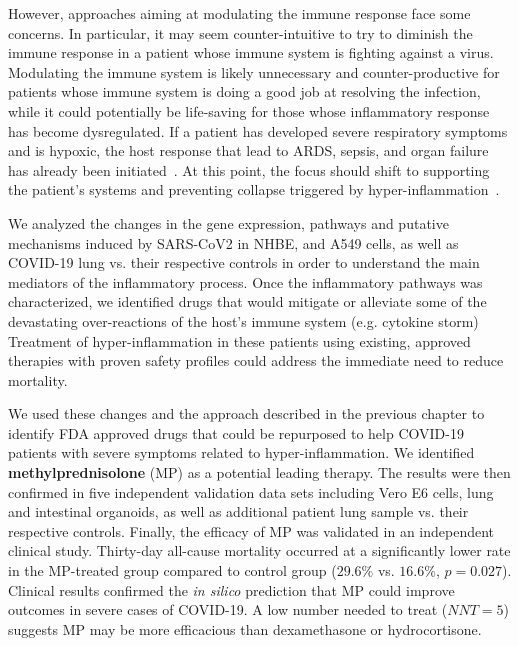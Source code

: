 However, approaches aiming at modulating the immune response face some concerns. In particular, it may seem counter-intuitive to try to diminish the immune response in a patient whose immune system is fighting against a virus. Modulating the immune system is likely unnecessary and counter-productive for patients whose immune system is doing a good job at resolving the infection, while it could potentially be life-saving for those whose inflammatory response has become dysregulated. If a patient has developed severe respiratory symptoms and is hypoxic, the host response that lead to ARDS, sepsis, and organ failure has already been initiated~\cite{mehta2020covid}. At this point, the focus should shift to supporting the patient's systems and preventing collapse triggered by hyper-inflammation~\cite{Ayres2020:survivingCOVID19}. 

We analyzed the changes in the gene expression, pathways and putative mechanisms induced by SARS-CoV2 in NHBE, and A549 cells, as well as COVID-19 lung vs. their respective controls in order to understand the main mediators of the inflammatory process. Once the inflammatory pathways was characterized, we identified drugs that would mitigate or alleviate some of the devastating over-reactions of the host's immune system (e.g. cytokine storm)
Treatment of hyper-inflammation in these patients using existing, approved therapies with proven safety profiles could address the immediate need to reduce mortality. 


We used these changes and the approach described in the previous chapter to identify FDA approved drugs that could be repurposed to help COVID-19 patients with severe symptoms related to hyper-inflammation. We identified \textbf{methylprednisolone} (MP) as a potential leading therapy. 
The results were then confirmed in five independent validation data sets including Vero E6 cells, lung and intestinal organoids, as well as additional patient lung sample vs. their respective controls. Finally, the efficacy of MP was validated in an independent clinical study. 
Thirty-day all-cause mortality occurred at a significantly lower rate in the MP-treated group compared to control group ($29.6\%$ vs. $16.6\%$, $p=0.027$). Clinical results confirmed the \emph{in silico} prediction that MP could improve outcomes in severe cases of COVID-19.  A low number needed to treat ($NNT=5$) suggests MP may be more efficacious than dexamethasone or hydrocortisone. 





